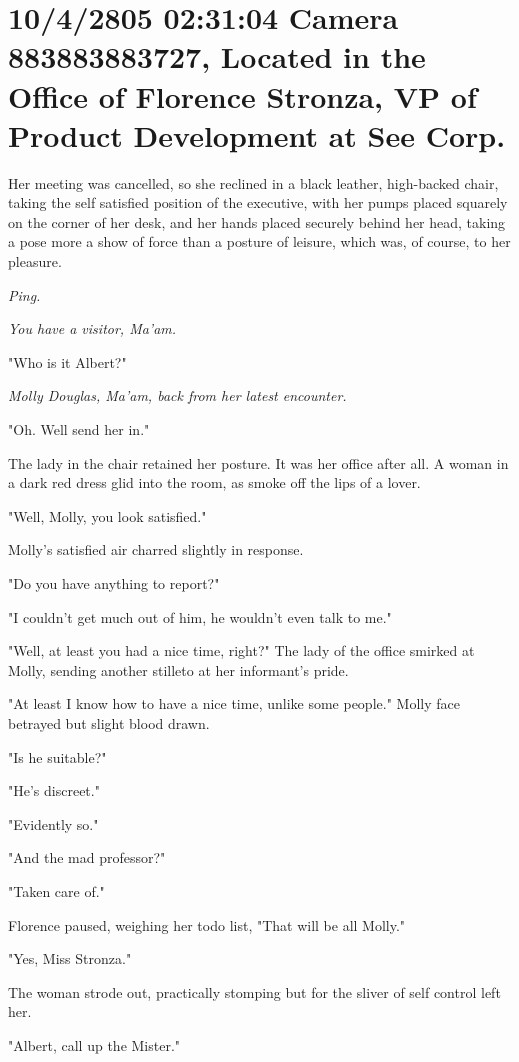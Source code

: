 \documentclass[12pt]{book}
\begin{document}
\section*{10/4/2805 02:31:04 Camera 883883883727, Located in the Office of Florence Stronza, VP of Product Development at See Corp.}
\label{sec:orgd5ec8c8}

Her meeting was cancelled, so she reclined in a black leather, high-backed chair, taking the self satisfied position of the executive, with her pumps placed squarely on the corner of her desk, and her hands placed securely behind her head, taking a pose more a show of force than a posture of leisure, which was, of course, to her pleasure.

\emph{Ping.}

\emph{You have a visitor, Ma'am.}

"Who is it Albert?"

\emph{Molly Douglas, Ma'am, back from her latest encounter.}

"Oh. Well send her in."

The lady in the chair retained her posture. It was her office after all. A woman in a dark red dress glid into the room, as smoke off the lips of a lover.

"Well, Molly, you look satisfied."

Molly's satisfied air charred slightly in response.

"Do you have anything to report?"

"I couldn't get much out of him, he wouldn't even talk to me."

"Well, at least you had a nice time, right?" The lady of the office smirked at Molly, sending another stilleto at her informant's pride.

"At least I know how to have a nice time, unlike some people." Molly face betrayed but slight blood drawn.

"Is he suitable?"

"He's discreet."

"Evidently so." 

"And the mad professor?"

"Taken care of."

Florence paused, weighing her todo list, "That will be all Molly."

"Yes, Miss Stronza."

The woman strode out, practically stomping but for the sliver of self control left her.

"Albert, call up the Mister."
\end{document}
